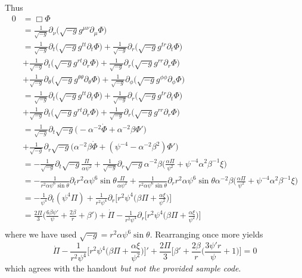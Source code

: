 \documentclass[12pt]{article}
\numberwithin{equation}{section}
\begin{document}
Thus
\begin{equation}
\begin{aligned}
0 &= \Box \Phi \\
&= \frac{1}{\sqrt{-g}} \partial_\nu \Big( \sqrt{-g} g^{\mu \nu} \partial_\mu \Phi \Big) \\
&= \frac{1}{\sqrt{-g}} \partial_t \Big( \sqrt{-g} g^{t t} \partial_t \Phi \Big) + \frac{1}{\sqrt{-g}} \partial_r \Big( \sqrt{-g} g^{t r} \partial_t \Phi \Big) \\
&+ \frac{1}{\sqrt{-g}} \partial_t \Big( \sqrt{-g} g^{r t} \partial_r \Phi \Big) + \frac{1}{\sqrt{-g}} \partial_r \Big( \sqrt{-g} g^{r r} \partial_r \Phi \Big) \\
&+ \frac{1}{\sqrt{-g}} \partial_\theta \Big( \sqrt{-g} g^{\theta \theta} \partial_\theta \Phi \Big) + \frac{1}{\sqrt{-g}} \partial_\phi \Big( \sqrt{-g} g^{\phi \phi} \partial_\phi \Phi \Big) \\
&= \frac{1}{\sqrt{-g}} \partial_t \Big( \sqrt{-g} g^{t t} \partial_t \Phi \Big) + \frac{1}{\sqrt{-g}} \partial_r \Big( \sqrt{-g} g^{t r} \partial_t \Phi \Big) \\
&+ \frac{1}{\sqrt{-g}} \partial_t \Big( \sqrt{-g} g^{r t} \partial_r \Phi \Big) + \frac{1}{\sqrt{-g}} \partial_r \Big( \sqrt{-g} g^{r r} \partial_r \Phi \Big) \\
&= \frac{1}{\sqrt{-g}} \partial_t \sqrt{-g} \Big( - \alpha^{-2} \dot{\Phi} + \alpha^{-2} \beta \Phi' \Big) \\
&+ \frac{1}{\sqrt{-g}} \partial_r \sqrt{-g} \Big( \alpha^{-2} \beta \dot{\Phi} + (\psi^{-4} - \alpha^{-2} \beta^2) \Phi' \Big) \\
&= - \frac{1}{\sqrt{-g}} \partial_t \sqrt{-g} \frac{\Pi}{\alpha \psi^2} + \frac{1}{\sqrt{-g}} \partial_r \sqrt{-g} \alpha^{-2} \beta \Big( \frac{\alpha \Pi}{\psi^2} + \psi^{-4} \alpha^2 \beta^{-1} \xi \Big) \\
&= - \frac{1}{r^2 \alpha \psi^6 \sin \theta} \partial_t r^2 \alpha \psi^6 \sin \theta \frac{\Pi}{\alpha \psi^2} + \frac{1}{r^2 \alpha \psi^6 \sin \theta} \partial_r r^2 \alpha \psi^6 \sin \theta \alpha^{-2} \beta \Big( \frac{\alpha \Pi}{\psi^2} + \psi^{-4} \alpha^2 \beta^{-1} \xi \Big) \\
&= - \frac{1}{\psi^4} \partial_t (\psi^4 \Pi) + \frac{1}{r^2 \psi^4} \partial_r \Big[ r^2 \psi^4 \Big( \beta \Pi + \frac{\alpha \xi}{\psi^{2}} \Big) \Big] \\
&= \frac{2 \Pi}{3} \Big( \frac{6 \beta \psi'}{\psi} + \frac{2 \beta}{r} + \beta' \Big) + \dot{\Pi} - \frac{1}{r^2 \psi^4} \partial_r \Big[ r^2 \psi^4 \Big( \beta \Pi + \frac{\alpha \xi}{\psi^{2}} \Big) \Big] \\
\end{aligned}
\end{equation}
where we have used $\sqrt{-g} = r^2 \alpha \psi^6 \sin \theta$. Rearranging once more yields
\begin{equation}
\boxed{ \dot{\Pi} - \frac{1}{r^2 \psi^4} \Big[ r^2 \psi^4 \Big( \beta \Pi + \frac{\alpha \xi}{\psi^{2}} \Big) \Big]' + \frac{2 \Pi}{3} \Big[ \beta' + \frac{2 \beta}{r} \Big( \frac{3 \psi' r}{\psi} + 1 \Big) \Big] = 0}
\end{equation}
which agrees with the handout \textit{but not the provided sample code}.
\end{document}
